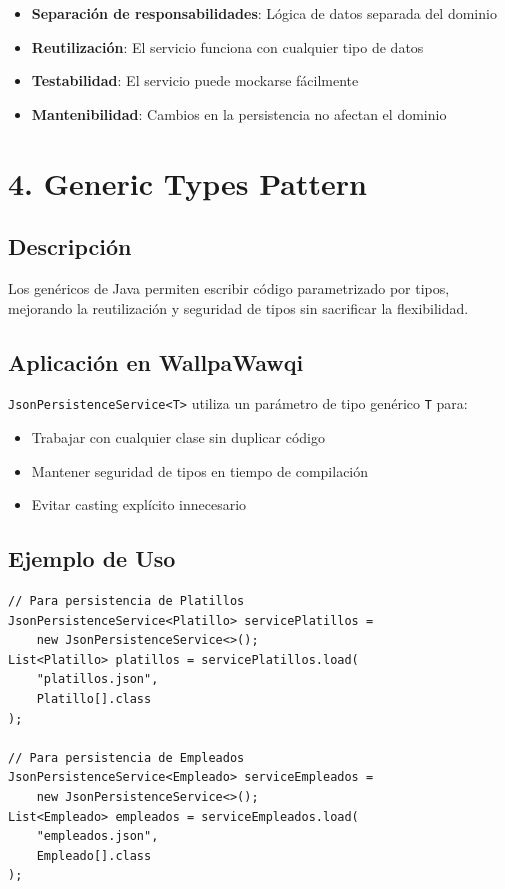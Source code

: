 \documentclass[12pt, a4paper]{report}
\begin{document}
\begin{itemize}
    \item \textbf{Separación de responsabilidades}: Lógica de datos separada del dominio
    \item \textbf{Reutilización}: El servicio funciona con cualquier tipo de datos
    \item \textbf{Testabilidad}: El servicio puede mockarse fácilmente
    \item \textbf{Mantenibilidad}: Cambios en la persistencia no afectan el dominio
\end{itemize}

\newpage

\section{4. Generic Types Pattern}

\subsection{Descripción}

Los genéricos de Java permiten escribir código parametrizado por tipos, mejorando la reutilización y seguridad de tipos sin sacrificar la flexibilidad.

\subsection{Aplicación en WallpaWawqi}

\texttt{JsonPersistenceService<T>} utiliza un parámetro de tipo genérico \texttt{T} para:

\begin{itemize}
    \item Trabajar con cualquier clase sin duplicar código
    \item Mantener seguridad de tipos en tiempo de compilación
    \item Evitar casting explícito innecesario
\end{itemize}

\subsection{Ejemplo de Uso}

\begin{verbatim}
// Para persistencia de Platillos
JsonPersistenceService<Platillo> servicePlatillos =
    new JsonPersistenceService<>();
List<Platillo> platillos = servicePlatillos.load(
    "platillos.json",
    Platillo[].class
);

// Para persistencia de Empleados
JsonPersistenceService<Empleado> serviceEmpleados =
    new JsonPersistenceService<>();
List<Empleado> empleados = serviceEmpleados.load(
    "empleados.json",
    Empleado[].class
);
\end{verbatim}
\end{document}
